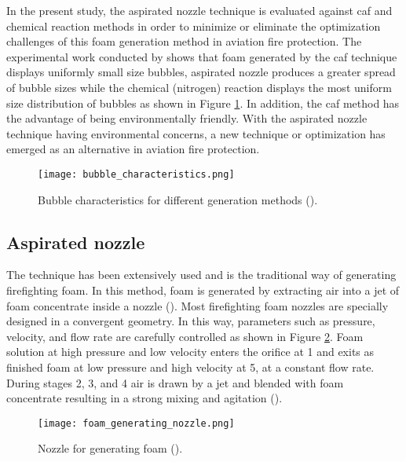 In the present study, the aspirated nozzle technique is evaluated against \acrshort{caf} and chemical reaction methods in order to minimize or eliminate the optimization challenges of this foam generation method in aviation fire protection. The experimental work conducted by \cite{laundess2012suppression} shows that foam generated by the \acrshort{caf} technique displays uniformly small size bubbles, aspirated nozzle produces a greater spread of bubble sizes while the chemical (nitrogen) reaction displays the most uniform size distribution of bubbles as shown in Figure \ref{ch2:figure:characteristics}. In addition, the \acrshort{caf} method has the advantage of being environmentally friendly.  With the aspirated nozzle technique having environmental concerns, a new technique or optimization has emerged as an alternative in aviation fire protection. 

\begin{figure}[H]
    \centering
    \texttt{[image: bubble\_characteristics.png]}
    \caption{Bubble characteristics for different generation methods (\cite{laundess2012suppression}).}
    \label{ch2:figure:characteristics}
\end{figure}

\subsection{Aspirated nozzle}
The technique has been extensively used and is the traditional way of generating firefighting foam. In this method, foam is generated by extracting air into a jet of foam concentrate inside a nozzle (\cite{xi2017experimental}). Most firefighting foam nozzles are specially designed in a convergent geometry. In this way, parameters such as pressure, velocity, and flow rate are carefully controlled as shown in Figure \ref{ch2:figure:nozzle}. Foam solution at high pressure and low velocity enters the orifice at 1 and exits as finished foam at low pressure and high velocity at 5, at a constant flow rate. During stages 2, 3, and 4 air is drawn by a jet and blended with foam concentrate resulting in a strong mixing and agitation (\cite{csb2016phenomenological}).

\begin{figure}[H]
    \centering
    \texttt{[image: foam\_generating\_nozzle.png]}
    \caption{Nozzle for generating foam (\cite{csb2016phenomenological}).}
    \label{ch2:figure:nozzle}
\end{figure}

